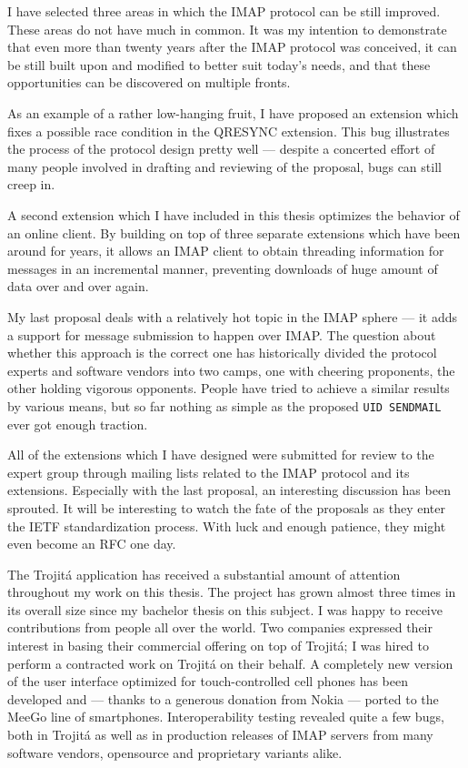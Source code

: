 \documentclass[trojita]{subfiles}
\begin{document}
I have selected three areas in which the IMAP protocol can be still improved.  These areas do not have much in common.
It was my intention to demonstrate that even more than twenty years after the IMAP protocol was conceived, it can be
still built upon and modified to better suit today's needs, and that these opportunities can be discovered on multiple
fronts.

As an example of a rather low-hanging fruit, I have proposed an extension which fixes a possible race condition in the
QRESYNC extension.  This bug illustrates the process of the protocol design pretty well --- despite a concerted effort
of many people involved in drafting and reviewing of the proposal, bugs can still creep in.

A second extension which I have included in this thesis optimizes the behavior of an online client.  By building on top
of three separate extensions which have been around for years, it allows an IMAP client to obtain threading information
for messages in an incremental manner, preventing downloads of huge amount of data over and over again.

My last proposal deals with a relatively hot topic in the IMAP sphere --- it adds a support for message submission to
happen over IMAP.  The question about whether this approach is the correct one has historically divided the protocol
experts and software vendors into two camps, one with cheering proponents, the other holding vigorous opponents.  People
have tried to achieve a similar results by various means, but so far nothing as simple as the proposed {\tt UID
SENDMAIL} ever got enough traction.

All of the extensions which I have designed were submitted for review to the expert group through mailing lists related
to the IMAP protocol and its extensions.  Especially with the last proposal, an interesting discussion has been sprouted.
It will be interesting to watch the fate of the proposals as they enter the IETF standardization process.  With luck and
enough patience, they might even become an RFC one day.

The Trojitá application has received a substantial amount of attention throughout my work on this thesis.  The project
has grown almost three times in its overall size since my bachelor thesis on this subject.  I was happy to receive
contributions from people all over the world.  Two companies expressed their interest in basing their commercial
offering on top of Trojitá; I was hired to perform a contracted work on Trojitá on their behalf.  A completely new
version of the user interface optimized for touch-controlled cell phones has been developed and --- thanks to a generous
donation from Nokia --- ported to the MeeGo line of smartphones.  Interoperability testing revealed quite a few bugs,
both in Trojitá as well as in production releases of IMAP servers from many software vendors, opensource and proprietary
variants alike.
\end{document}
